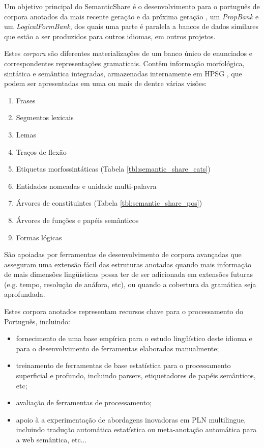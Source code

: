 Um objetivo principal do SemanticShare é o desenvolvimento para o português de corpora anotados da mais recente geração e da próxima geração \cite{semanticshare}, um \emph{PropBank} e um \emph{LogicalFormBank}, dos quais uma parte é paralela a bancos de dados similares que estão a ser produzidos para outros idiomas, em outros projetos.

Estes \emph{corpora} são diferentes materializações de um banco único de enunciados e correspondentes representações gramaticais. Contêm informação morfológica, sintática e semântica integradas, armazenadas internamente em HPSG \cite{branco08}, que podem ser apresentadas em uma ou mais de dentre várias visões:

\begin{enumerate}
  \item Frases
  \item Segmentos lexicais
  \item Lemas
  \item Traços de flexão
  \item Etiquetas morfossintáticas (Tabela \ref{tbl:semantic_share_cats})
  \item Entidades nomeadas e unidade multi-palavra
  \item Árvores de constituintes (Tabela \ref{tbl:semantic_share_pos})
  \item Árvores de funções e papéis semânticos
  \item Formas lógicas
\end{enumerate}

São apoiadas por ferramentas de desenvolvimento de corpora avançadas que asseguram uma extensão fácil das estruturas anotadas quando mais informação de mais dimensões lingüísticas possa ter de ser adicionada em extensões futuras (e.g. tempo, resolução de anáfora, etc), ou quando a cobertura da gramática seja aprofundada.

Estes corpora anotados representam recursos chave para o processamento do Português, incluindo:


\begin{itemize}
  \item fornecimento de uma base empírica para o estudo lingüístico deste idioma e para o desenvolvimento de ferramentas elaboradas manualmente;
  \item treinamento de ferramentas de base estatística para o processamento superficial e profundo, incluindo parsers, etiquetadores de papéis semânticos, etc;
  \item avaliação de ferramentas de processamento;
  \item  apoio à a experimentação de abordagens inovadoras em PLN multilingue, incluindo tradução automática estatística ou meta-anotação automática para a web semântica, etc...
\end{itemize}

